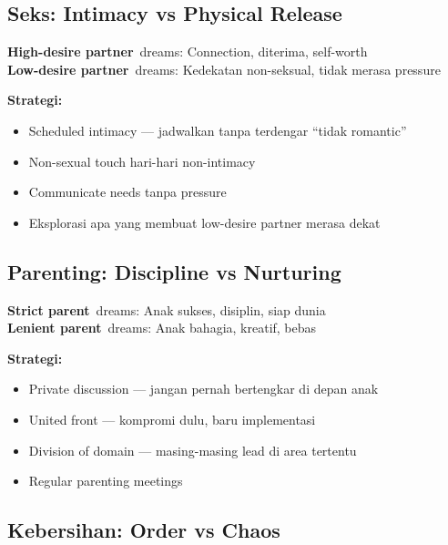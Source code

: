\subsection{Seks: Intimacy vs Physical Release}

\begin{praktikbox}
\textbf{High-desire partner}\ dreams: Connection, diterima, self-worth\\
\textbf{Low-desire partner}\ dreams: Kedekatan non-seksual, tidak merasa pressure

\textbf{Strategi:}
\begin{itemize}
    \item Scheduled intimacy --- jadwalkan tanpa terdengar ``tidak romantic''
    \item Non-sexual touch hari-hari non-intimacy
    \item Communicate needs tanpa pressure
    \item Eksplorasi apa yang membuat low-desire partner merasa dekat
\end{itemize}
\end{praktikbox}

\subsection{Parenting: Discipline vs Nurturing}

\begin{tipbox}
\textbf{Strict parent}\ dreams: Anak sukses, disiplin, siap dunia\\
\textbf{Lenient parent}\ dreams: Anak bahagia, kreatif, bebas

\textbf{Strategi:}
\begin{itemize}
    \item Private discussion --- jangan pernah bertengkar di depan anak
    \item United front --- kompromi dulu, baru implementasi
    \item Division of domain --- masing-masing lead di area tertentu
    \item Regular parenting meetings
\end{itemize}
\end{tipbox}

\subsection{Kebersihan: Order vs Chaos}


